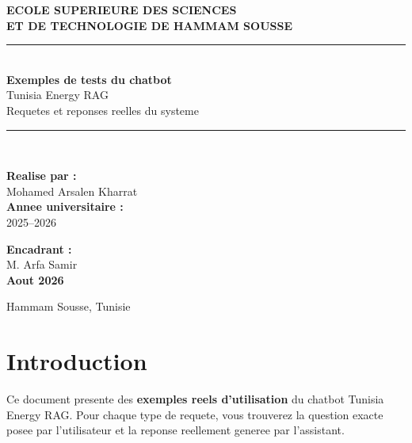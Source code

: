 \documentclass[12pt,a4paper,oneside]{article}
\begin{document}
\thispagestyle{empty}
\begin{center}
\vspace*{2cm}

{\Large\bfseries ECOLE SUPERIEURE DES SCIENCES\\ET DE TECHNOLOGIE DE HAMMAM SOUSSE}\\[1cm]

\rule{0.8\textwidth}{1.5pt}\\[1cm]

{\Huge\bfseries\color{MainBlue} Exemples de tests du chatbot}\\[0.5cm]

{\Large Tunisia Energy RAG}\\[0.3cm]

{\large Requetes et reponses reelles du systeme}\\[1.5cm]

\rule{0.8\textwidth}{1.5pt}\\[1.5cm]

\begin{minipage}{0.45\textwidth}\raggedright
\textbf{Realise par :}\\
Mohamed Arsalen Kharrat\\[0.5cm]
\textbf{Annee universitaire :}\\
2025--2026
\end{minipage}\hfill
\begin{minipage}{0.45\textwidth}\raggedleft
\textbf{Encadrant :}\\
M. Arfa Samir\\[0.5cm]
\textbf{Aout 2026}
\end{minipage}

\vfill
{\small Hammam Sousse, Tunisie}
\end{center}

\clearpage

\section*{Introduction}

Ce document presente des \textbf{exemples reels d'utilisation} du chatbot Tunisia Energy RAG. Pour chaque type de requete, vous trouverez la question exacte posee par l'utilisateur et la reponse reellement generee par l'assistant.
\end{document}
